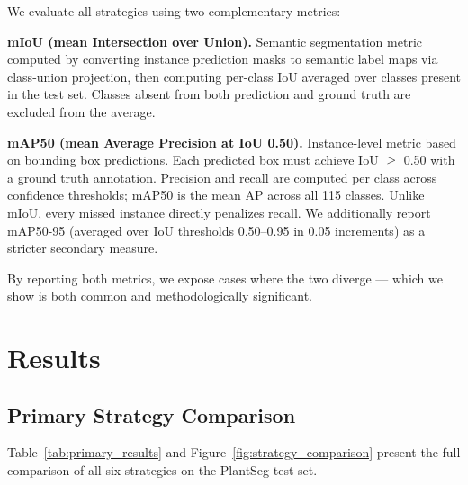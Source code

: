 \documentclass[preprint,12pt]{elsarticle}
\begin{document}
We evaluate all strategies using two complementary metrics:

\textbf{mIoU (mean Intersection over Union).} Semantic segmentation metric computed by converting instance prediction masks to semantic label maps via class-union projection, then computing per-class IoU averaged over classes present in the test set. Classes absent from both prediction and ground truth are excluded from the average.

\textbf{mAP50 (mean Average Precision at IoU 0.50).} Instance-level metric based on bounding box predictions. Each predicted box must achieve IoU $\geq$ 0.50 with a ground truth annotation. Precision and recall are computed per class across confidence thresholds; mAP50 is the mean AP across all 115 classes. Unlike mIoU, every missed instance directly penalizes recall. We additionally report mAP50-95 (averaged over IoU thresholds 0.50--0.95 in 0.05 increments) as a stricter secondary measure.

By reporting both metrics, we expose cases where the two diverge --- which we show is both common and methodologically significant.

\section{Results}
\label{sec:results}

\subsection{Primary Strategy Comparison}

Table~\ref{tab:primary_results} and Figure~\ref{fig:strategy_comparison} present the full comparison of all six strategies on the PlantSeg test set.
\end{document}
